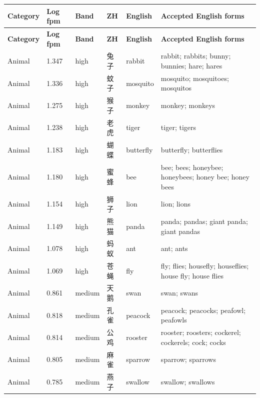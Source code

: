{
\normalsize
\setlength{\tabcolsep}{2pt}
\renewcommand{\arraystretch}{1.0}
\setlength{\LTcapwidth}{\textwidth}
\begin{longtable}[c]{@{}>{\raggedright\arraybackslash}p{1.85cm}l l l>{\raggedright\arraybackslash}p{1.85cm}>{\raggedright\arraybackslash}p{8.10cm}@{}}
\hline
\textbf{Category} & \textbf{Log fpm} & \textbf{Band} & \textbf{ZH} & \textbf{English} & \textbf{Accepted English forms} \\
\hline
\endfirsthead
\hline
\textbf{Category} & \textbf{Log fpm} & \textbf{Band} & \textbf{ZH} & \textbf{English} & \textbf{Accepted English forms} \\
\hline
\endhead
\endfoot
\endlastfoot
Animal & 1.347 & high & 兔子 & rabbit & rabbit; rabbits; bunny; bunnies; hare; hares \\
Animal & 1.336 & high & 蚊子 & mosquito & mosquito; mosquitoes; mosquitos \\
Animal & 1.275 & high & 猴子 & monkey & monkey; monkeys \\
Animal & 1.238 & high & 老虎 & tiger & tiger; tigers \\
Animal & 1.183 & high & 蝴蝶 & butterfly & butterfly; butterflies \\
Animal & 1.180 & high & 蜜蜂 & bee & bee; bees; honeybee; honeybees; honey bee; honey bees \\
Animal & 1.154 & high & 狮子 & lion & lion; lions \\
Animal & 1.149 & high & 熊猫 & panda & panda; pandas; giant panda; giant pandas \\
Animal & 1.078 & high & 蚂蚁 & ant & ant; ants \\
Animal & 1.069 & high & 苍蝇 & fly & fly; flies; housefly; houseflies; house fly; house flies \\
Animal & 0.861 & medium & 天鹅 & swan & swan; swans \\
Animal & 0.818 & medium & 孔雀 & peacock & peacock; peacocks; peafowl; peafowls \\
Animal & 0.814 & medium & 公鸡 & rooster & rooster; roosters; cockerel; cockerels; cock; cocks \\
Animal & 0.805 & medium & 麻雀 & sparrow & sparrow; sparrows \\
Animal & 0.785 & medium & 燕子 & swallow & swallow; swallows \\

\end{longtable}}
